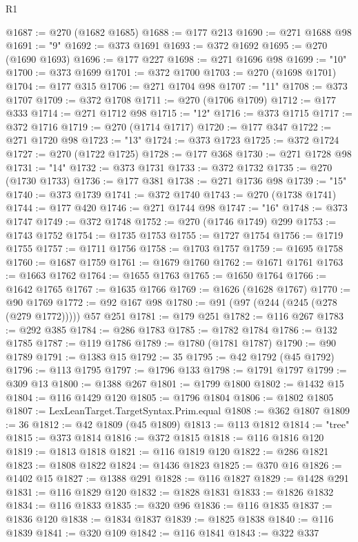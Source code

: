 \begin{lexlean}{R1}
\begin{coremodule}
@1687 := @270 (@1682 @1685)
@1688 := @177 @213
@1690 := @271 @1688 @98
@1691 := "9"
@1692 := @373 @1691
@1693 := @372 @1692
@1695 := @270 (@1690 @1693)
@1696 := @177 @227
@1698 := @271 @1696 @98
@1699 := "10"
@1700 := @373 @1699
@1701 := @372 @1700
@1703 := @270 (@1698 @1701)
@1704 := @177 @315
@1706 := @271 @1704 @98
@1707 := "11"
@1708 := @373 @1707
@1709 := @372 @1708
@1711 := @270 (@1706 @1709)
@1712 := @177 @333
@1714 := @271 @1712 @98
@1715 := "12"
@1716 := @373 @1715
@1717 := @372 @1716
@1719 := @270 (@1714 @1717)
@1720 := @177 @347
@1722 := @271 @1720 @98
@1723 := "13"
@1724 := @373 @1723
@1725 := @372 @1724
@1727 := @270 (@1722 @1725)
@1728 := @177 @368
@1730 := @271 @1728 @98
@1731 := "14"
@1732 := @373 @1731
@1733 := @372 @1732
@1735 := @270 (@1730 @1733)
@1736 := @177 @381
@1738 := @271 @1736 @98
@1739 := "15"
@1740 := @373 @1739
@1741 := @372 @1740
@1743 := @270 (@1738 @1741)
@1744 := @177 @420
@1746 := @271 @1744 @98
@1747 := "16"
@1748 := @373 @1747
@1749 := @372 @1748
@1752 := @270 (@1746 @1749) @299
@1753 := @1743 @1752
@1754 := @1735 @1753
@1755 := @1727 @1754
@1756 := @1719 @1755
@1757 := @1711 @1756
@1758 := @1703 @1757
@1759 := @1695 @1758
@1760 := @1687 @1759
@1761 := @1679 @1760
@1762 := @1671 @1761
@1763 := @1663 @1762
@1764 := @1655 @1763
@1765 := @1650 @1764
@1766 := @1642 @1765
@1767 := @1635 @1766
@1769 := @1626 (@1628 @1767)
@1770 := @90 @1769
@1772 := @92 @167 @98
@1780 := @91 (@97 (@244 (@245 (@278 (@279 @1772))))) @57 @251
@1781 := @179 @251
@1782 := @116 @267
@1783 := @292 @385
@1784 := @286 @1783
@1785 := @1782 @1784
@1786 := @132 @1785
@1787 := @119 @1786
@1789 := @1780 (@1781 @1787)
@1790 := @90 @1789
@1791 := @1383 @15
@1792 := 35
@1795 := @42 @1792 (@45 @1792)
@1796 := @113 @1795
@1797 := @1796 @133
@1798 := @1791 @1797
@1799 := @309 @13
@1800 := @1388 @267
@1801 := @1799 @1800
@1802 := @1432 @15
@1804 := @116 @1429 @120
@1805 := @1796 @1804
@1806 := @1802 @1805
@1807 := LexLeanTarget.TargetSyntax.Prim.equal
@1808 := @362 @1807
@1809 := 36
@1812 := @42 @1809 (@45 @1809)
@1813 := @113 @1812
@1814 := "tree"
@1815 := @373 @1814
@1816 := @372 @1815
@1818 := @116 @1816 @120
@1819 := @1813 @1818
@1821 := @116 @1819 @120
@1822 := @286 @1821
@1823 := @1808 @1822
@1824 := @1436 @1823
@1825 := @370 @16
@1826 := @1402 @15
@1827 := @1388 @291
@1828 := @116 @1827
@1829 := @1428 @291
@1831 := @116 @1829 @120
@1832 := @1828 @1831
@1833 := @1826 @1832
@1834 := @116 @1833
@1835 := @320 @96
@1836 := @116 @1835
@1837 := @1836 @120
@1838 := @1834 @1837
@1839 := @1825 @1838
@1840 := @116 @1839
@1841 := @320 @109
@1842 := @116 @1841
@1843 := @322 @337

\end{coremodule}
\end{lexlean}
